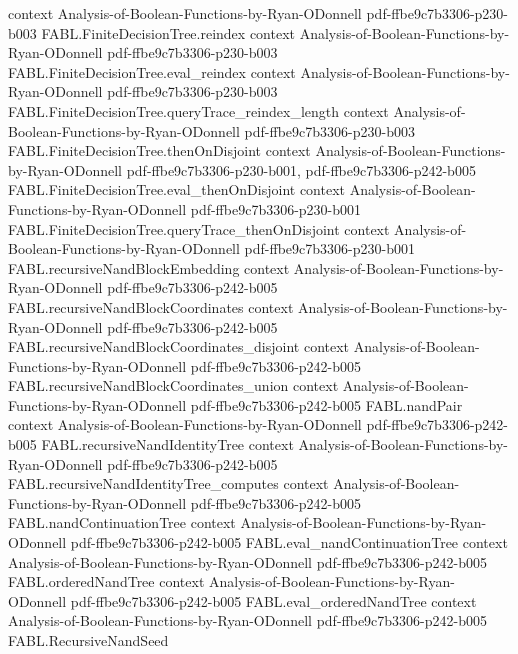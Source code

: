 \begin{theorem}
  {context}
  {Analysis-of-Boolean-Functions-by-Ryan-ODonnell}
  {pdf-ffbe9c7b3306-p230-b003}
\proofstep
  {FABL.FiniteDecisionTree.reindex}
  {context}
  {Analysis-of-Boolean-Functions-by-Ryan-ODonnell}
  {pdf-ffbe9c7b3306-p230-b003}
\proofstep
  {FABL.FiniteDecisionTree.eval_reindex}
  {context}
  {Analysis-of-Boolean-Functions-by-Ryan-ODonnell}
  {pdf-ffbe9c7b3306-p230-b003}
\proofstep
  {FABL.FiniteDecisionTree.queryTrace_reindex_length}
  {context}
  {Analysis-of-Boolean-Functions-by-Ryan-ODonnell}
  {pdf-ffbe9c7b3306-p230-b003}
\proofstep
  {FABL.FiniteDecisionTree.thenOnDisjoint}
  {context}
  {Analysis-of-Boolean-Functions-by-Ryan-ODonnell}
  {pdf-ffbe9c7b3306-p230-b001,
    pdf-ffbe9c7b3306-p242-b005}
\proofstep
  {FABL.FiniteDecisionTree.eval_thenOnDisjoint}
  {context}
  {Analysis-of-Boolean-Functions-by-Ryan-ODonnell}
  {pdf-ffbe9c7b3306-p230-b001}
\proofstep
  {FABL.FiniteDecisionTree.queryTrace_thenOnDisjoint}
  {context}
  {Analysis-of-Boolean-Functions-by-Ryan-ODonnell}
  {pdf-ffbe9c7b3306-p230-b001}
\proofstep
  {FABL.recursiveNandBlockEmbedding}
  {context}
  {Analysis-of-Boolean-Functions-by-Ryan-ODonnell}
  {pdf-ffbe9c7b3306-p242-b005}
\proofstep
  {FABL.recursiveNandBlockCoordinates}
  {context}
  {Analysis-of-Boolean-Functions-by-Ryan-ODonnell}
  {pdf-ffbe9c7b3306-p242-b005}
\proofstep
  {FABL.recursiveNandBlockCoordinates_disjoint}
  {context}
  {Analysis-of-Boolean-Functions-by-Ryan-ODonnell}
  {pdf-ffbe9c7b3306-p242-b005}
\proofstep
  {FABL.recursiveNandBlockCoordinates_union}
  {context}
  {Analysis-of-Boolean-Functions-by-Ryan-ODonnell}
  {pdf-ffbe9c7b3306-p242-b005}
\proofstep
  {FABL.nandPair}
  {context}
  {Analysis-of-Boolean-Functions-by-Ryan-ODonnell}
  {pdf-ffbe9c7b3306-p242-b005}
\proofstep
  {FABL.recursiveNandIdentityTree}
  {context}
  {Analysis-of-Boolean-Functions-by-Ryan-ODonnell}
  {pdf-ffbe9c7b3306-p242-b005}
\proofstep
  {FABL.recursiveNandIdentityTree_computes}
  {context}
  {Analysis-of-Boolean-Functions-by-Ryan-ODonnell}
  {pdf-ffbe9c7b3306-p242-b005}
\proofstep
  {FABL.nandContinuationTree}
  {context}
  {Analysis-of-Boolean-Functions-by-Ryan-ODonnell}
  {pdf-ffbe9c7b3306-p242-b005}
\proofstep
  {FABL.eval_nandContinuationTree}
  {context}
  {Analysis-of-Boolean-Functions-by-Ryan-ODonnell}
  {pdf-ffbe9c7b3306-p242-b005}
\proofstep
  {FABL.orderedNandTree}
  {context}
  {Analysis-of-Boolean-Functions-by-Ryan-ODonnell}
  {pdf-ffbe9c7b3306-p242-b005}
\proofstep
  {FABL.eval_orderedNandTree}
  {context}
  {Analysis-of-Boolean-Functions-by-Ryan-ODonnell}
  {pdf-ffbe9c7b3306-p242-b005}
\proofstep
  {FABL.RecursiveNandSeed}

\end{theorem}
